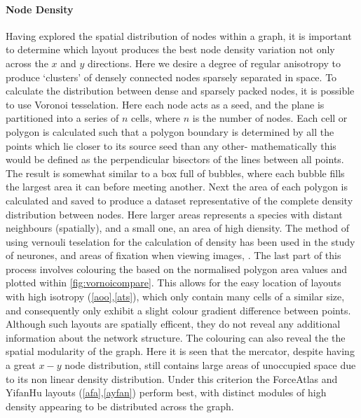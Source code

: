 \paragraph{Node Density}
Having explored the spatial distribution of nodes within a graph, it is important to determine which layout produces the best node density variation not only across the $x$ and $y$ directions. Here we desire a degree of regular anisotropy to produce `clusters' of densely connected nodes sparsely separated in space. To calculate the distribution between dense and sparsely packed nodes, it is possible to use Voronoi tesselation. Here each node acts as a seed, and the plane is partitioned into a series of $n$ cells, where $n$ is the number of nodes. Each cell or polygon is calculated such that a polygon boundary is determined by all the points which lie closer to its source seed than any other- mathematically this would be defined as the perpendicular bisectors of the lines between all points. The result is somewhat similar to a box full of bubbles, where each bubble fills the largest area it can before meeting another. Next the area of each polygon is calculated and saved to produce a dataset representative of the complete density distribution between nodes. Here larger areas represents a species with distant neighbours (spatially), and a small one, an area of high diensity. The method of using vernouli teselation for the calculation of density has been used in the study of neurones, \cite{neurone} and areas of fixation when viewing images, \cite{fixation}. 
The last part of this process involves colouring the based on the normalised polygon area values and plotted within \autoref{fig:vornoicompare}. This allows for the easy location of layouts with high isotropy (\autoref{aoo},\autoref{ats}), which only contain many cells of a similar size, and consequently only exhibit a slight colour gradient difference between points. Although such layouts are spatially efficent, they do not reveal any additional information about the network structure. 
The colouring can also reveal the the spatial modularity of the graph. Here it is seen that the mercator, despite having a great $x-y$ node distribution, still contains large areas of unoccupied space due to its non linear density distribution. Under this criterion the ForceAtlas and YifanHu layouts (\autoref{afa},\autoref{ayfan}) perform best, with distinct modules of high density appearing to be distributed across the graph. 



